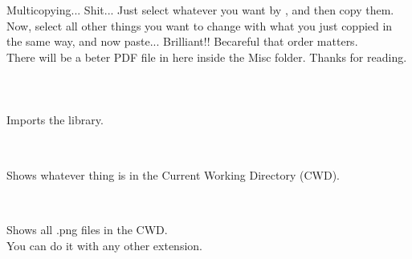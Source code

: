 \documentclass[a4paper,18pt]{article}
\begin{document}
Multicopying... Shit... Just select whatever you want by {\textbf{\color{Red}{holding Ctrl, and select sth by mouse}}}, and then copy them. Now, select all other things you want to change with what you just coppied in the same way, and now paste... Brilliant!! Becareful that order matters.\\

There will be a beter PDF file in here inside the Misc folder. Thanks for reading.\\\\










\section{\colorbox {Abi}{}}
\subsection{\colorbox {matgreen}{\color{white}{\large import glob}}}
Imports the library.\\\\


\subsection{\colorbox {matgreen}{\color{white}{\large glob.glob('*')}}}
Shows whatever thing is in the Current Working Directory (CWD).\\\\


\subsection{\colorbox {matgreen}{\color{white}{\large glob.glob('*.png')}}}
Shows all .png files in the CWD.\\ 
You can do it with any other extension.\\\\
\end{document}
